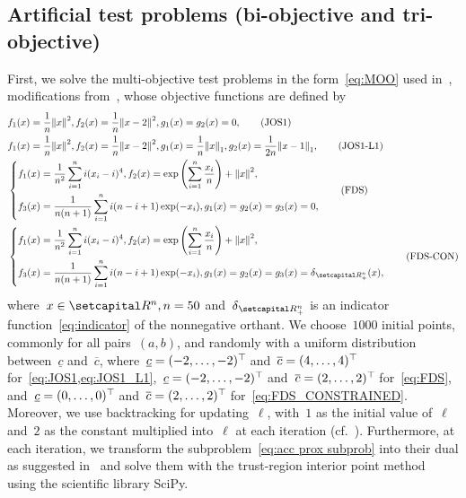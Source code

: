 \documentclass[../main]{subfiles}
\begin{document}
\subsection{Artificial test problems (bi-objective and tri-objective)}
First, we solve the multi-objective test problems in the form~\cref{eq:MOO} used in~\cite{Tanabe2022a}, modifications from~\cite{Jin2001,Fliege2009}, whose objective functions are defined by
\begin{align}
    &f_1(x) = \frac{1}{n} \norm*{x}^2,
    f_2(x) = \frac{1}{n} \norm*{x - 2}^2,
    g_1(x) = g_2(x) = 0, \tag{JOS1}\label{eq:JOS1} \\
    &f_1(x) = \frac{1}{n} \norm*{x}^2,
    f_2(x) = \frac{1}{n} \norm*{x - 2}^2,
    g_1(x) = \frac{1}{n} \norm*{x}_1,
    g_2(x) = \frac{1}{2n} \norm*{x - 1}_1,
    \label{eq:JOS1_L1} \tag{JOS1-L1}\\
    &\left\{\begin{aligned} 
            f_1(x) &= \frac{1}{n^2} \sum_{i = 1}^{n} i (x_i - i)^4,
            f_2(x) = \exp \left( \sum_{i = 1}^{n} \frac{x_i}{n} \right) + \norm*{x}^2,\\
            f_3(x) &= \frac{1}{n (n + 1)} \sum_{i = 1}^{n} i (n - i + 1) \exp (- x_i),
            g_1(x) = g_2(x) = g_3(x) = 0,
    \end{aligned} \right. \label{eq:FDS} \tag{FDS}\\
    &\left\{\begin{aligned} 
            f_1(x) &= \frac{1}{n^2} \sum_{i = 1}^{n} i (x_i - i)^4,
            f_2(x) = \exp \left( \sum_{i = 1}^{n} \frac{x_i}{n} \right) + \norm*{x}^2,\\
            f_3(x) &= \frac{1}{n (n + 1)} \sum_{i = 1}^{n} i (n - i + 1) \exp (- x_i),
            g_1(x) = g_2(x) = g_3(x) = \indicator_{\setRpos^n}(x),
    \end{aligned} \right.\label{eq:FDS_CONSTRAINED} \tag{FDS-CON}
\end{align}
where~$x \in \setR^n, n = 50$ and~$\indicator_{\setRpos^n}$ is an indicator function~\cref{eq:indicator} of the nonnegative orthant.
We choose~$1000$ initial points, commonly for all pairs~$(a, b)$, and randomly with a uniform distribution between~$\underline{c}$ and~$\overline{c}$, where~$\underline{c} = (-2, \dots, -2)^\top\hspace{-1pt}$ and~$\overline{c} = (4, \dots, 4)^\top\hspace{-1pt}$ for~\cref{eq:JOS1,eq:JOS1_L1},~$\underline{c} = (-2, \dots, -2)^\top\hspace{-1pt}$ and~$\overline{c} = (2, \dots, 2)^\top\hspace{-1pt}$ for~\cref{eq:FDS}, and~$\underline{c} = (0, \dots, 0)^\top\hspace{-1pt}$ and~$\overline{c} = (2, \dots, 2)^\top\hspace{-1pt}$ for~\cref{eq:FDS_CONSTRAINED}.
Moreover, we use backtracking for updating~$\ell$, with~$1$ as the initial value of~$\ell$ and~$2$ as the constant multiplied into~$\ell$ at each iteration (cf.~\cite[Remark~4.1~(v)]{Tanabe2022a}).
Furthermore, at each iteration, we transform the subproblem~\cref{eq:acc prox subprob} into their dual as suggested in~\cite{Tanabe2022a} and solve them with the trust-region interior point method~\cite{Byrd1999} using the scientific library SciPy.
\end{document}
